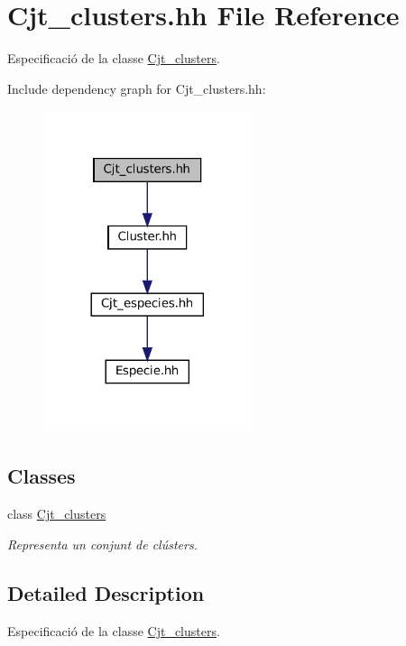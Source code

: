 \hypertarget{_cjt__clusters_8hh}{}\section{Cjt\+\_\+clusters.\+hh File Reference}
\label{_cjt__clusters_8hh}


Especificació de la classe \hyperlink{class_cjt__clusters}{Cjt\+\_\+clusters}.  


Include dependency graph for Cjt\+\_\+clusters.\+hh\+:\nopagebreak
\begin{figure}[H]
\begin{center}
\leavevmode
\includegraphics[width=173pt]{_cjt__clusters_8hh__incl}
\end{center}
\end{figure}
\subsection*{Classes}
\begin{DoxyCompactItemize}
\item 
class \hyperlink{class_cjt__clusters}{Cjt\+\_\+clusters}
\begin{DoxyCompactList}\small\item\em Representa un conjunt de clústers. \end{DoxyCompactList}\end{DoxyCompactItemize}


\subsection{Detailed Description}
Especificació de la classe \hyperlink{class_cjt__clusters}{Cjt\+\_\+clusters}. 

